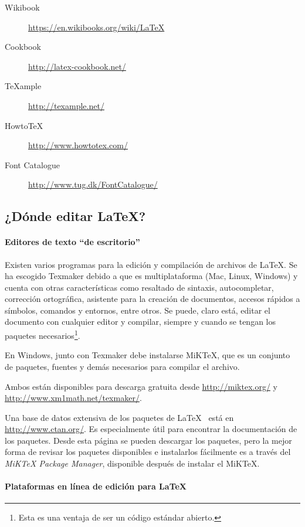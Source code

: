 \begin{description}
\item[Wikibook] \url{https://en.wikibooks.org/wiki/LaTeX}
\item[Cookbook] \url{http://latex-cookbook.net/}
\item[TeXample] \url{http://texample.net/}
\item[HowtoTeX] \url{http://www.howtotex.com/}
\item[Font Catalogue] \url{http://www.tug.dk/FontCatalogue/}
\end{description}

\subsection{¿Dónde editar \LaTeX?}\label{S:programas}

\paragraph{Editores de texto ``de escritorio''}

Existen varios programas para la edición y compilación de archivos de \LaTeX. Se ha escogido Texmaker debido a que es multiplataforma (Mac, Linux, Windows) y cuenta con otras características como resaltado de sintaxis, autocompletar, corrección ortográfica, asistente para la creación de documentos, accesos rápidos a símbolos, comandos y entornos, entre otros. Se puede, claro está, editar el documento con cualquier editor y compilar, siempre y cuando se tengan los paquetes necesarios\footnote{Esta es una ventaja de ser un código estándar abierto.}.

En Windows, junto con Texmaker debe instalarse MiKTeX, que es un conjunto de paquetes, fuentes y demás necesarios para compilar el archivo.

Ambos están disponibles para descarga gratuita desde \url{http://miktex.org/} y \url{http://www.xm1math.net/texmaker/}.

Una base de datos extensiva de los paquetes de \LaTeX~ está en \url{http://www.ctan.org/}. Es especialmente útil para encontrar la documentación de los paquetes. Desde esta página se pueden descargar los paquetes, pero la mejor forma de revisar los paquetes disponibles e instalarlos fácilmente es a través del \emph{MiKTeX Package Manager}, disponible después de instalar el MiKTeX.

\paragraph{Plataformas en línea de edición para \LaTeX}

